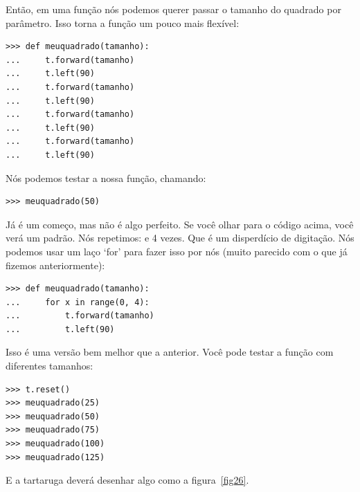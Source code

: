 Então, em uma função nós podemos querer passar o tamanho do quadrado por parâmetro. Isso torna a função um pouco mais flexível:

\begin{listing}
\begin{verbatim}
>>> def meuquadrado(tamanho):
...     t.forward(tamanho)
...     t.left(90)
...     t.forward(tamanho)
...     t.left(90)
...     t.forward(tamanho)
...     t.left(90)
...     t.forward(tamanho)
...     t.left(90)
\end{verbatim}
\end{listing}

\noindent
Nós podemos testar a nossa função, chamando:

\begin{listing}
\begin{verbatim}
>>> meuquadrado(50)
\end{verbatim}
\end{listing}

Já é um começo, mas não é algo perfeito. Se você olhar para o código acima, você verá um padrão. Nós repetimos:  e  4 vezes. Que é um disperdício de digitação. Nós podemos usar um laço `for' para fazer isso por nós (muito parecido com o que já fizemos anteriormente):

\begin{listing}
\begin{verbatim}
>>> def meuquadrado(tamanho):
...     for x in range(0, 4):
...         t.forward(tamanho)
...         t.left(90)
\end{verbatim}
\end{listing}

Isso é uma versão bem melhor que a anterior. Você pode testar a função com diferentes tamanhos:

\begin{listing}
\begin{verbatim}
>>> t.reset()
>>> meuquadrado(25)
>>> meuquadrado(50)
>>> meuquadrado(75)
>>> meuquadrado(100)
>>> meuquadrado(125)
\end{verbatim}
\end{listing}

E a tartaruga deverá desenhar algo como a figura~\ref{fig26}.

